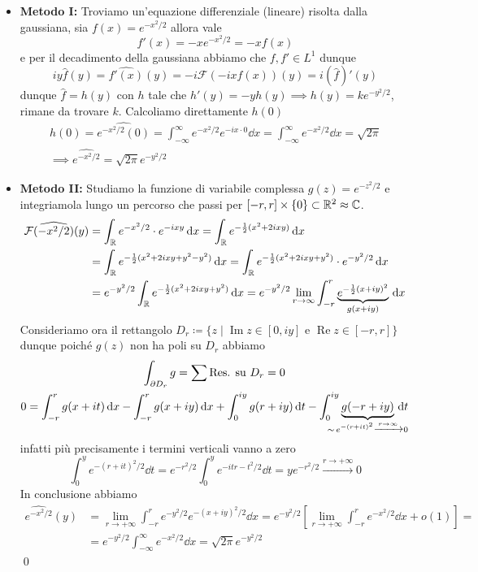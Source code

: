 \begin{itemize}
	\item \textbf{Metodo I:} Troviamo un'equazione differenziale (lineare) risolta dalla gaussiana, sia $f(x) = e^{-x^2 / 2}$ allora vale
		$$
		f'(x) = -x e^{-x^2/2} = -x f(x)
		$$
		e per il decadimento della gaussiana abbiamo che $f, f' \in L^1$ dunque
		$$
		i y \hat f(y) = \hat{f'(x)}(y) = -i \mathcal F(-i x f(x))(y) = i (\hat{f})' (y)
		$$
		dunque $\hat f = h(y)$ con $h$ tale che $h'(y) = -y h(y) \implies h(y) = k e^{-y^2 / 2}$, rimane da trovare $k$. Calcoliamo direttamente $h(0)$
		$$
		\begin{gathered}
			h(0) 
			= \hat{e^{-x^2/2}(0)} 
			= \int_{-\infty}^\infty e^{-x^2 / 2} e^{-ix \cdot 0} \dd x
			= \int_{-\infty}^\infty e^{-x^2 / 2} \dd x = \sqrt{2\pi} \\
			\implies \hat{e^{-x^2/2}} = \sqrt{2\pi} e^{-y^2 / 2}
		\end{gathered}
		$$

	\item \textbf{Metodo II:} Studiamo la funzione di variabile complessa $g(z) = e^{-z^2/2}$ e integriamola lungo un percorso che passi per $[-r, r] \times \{ 0 \} \subset \mathbb R^2 \approx \mathbb C$.
		$$
		\begin{aligned}
			\mathcal F(\widehat{-x^2/2})(y) 
			&= \int_\mathbb R e^{-x^2 / 2} \cdot e^{-ixy} \,\mathrm{d} x
			= \int_\mathbb R e^{-\frac{1}{2}(x^2 + 2ixy)} \,\mathrm{d} x \\
			&= \int_\mathbb R e^{-\frac{1}{2}(x^2 + 2ixy + y^2 - y^2)} \,\mathrm{d} x 
			= \int_\mathbb R e^{-\frac{1}{2}(x^2 + 2ixy + y^2)} \cdot e^{-y^2 / 2} \,\mathrm{d} x \\
			&= e^{-y^2 / 2} \int_\mathbb R e^{-\frac{1}{2}(x^2 + 2ixy + y^2)} \,\mathrm{d} x 
			= e^{-y^2 / 2} \lim_{r \to \infty} \int_{-r}^r \underbrace{e^{-\frac{1}{2}(x + iy)^2}}_{g(x + iy)} \,\mathrm{d} x
		\end{aligned}
		$$
		Consideriamo ora il rettangolo $D_r \coloneqq \{ z \mid \operatorname{Im} z \in [0, iy] \text{ e } \operatorname{Re} z \in [-r, r] \}$ dunque poiché $g(z)$ non ha poli su $D_r$ abbiamo
		$$
		\begin{gathered}
			\int_{\pd D_r} g = \sum \text{Res. su $D_r$} = 0 \\
			0 = \int_{-r}^r g(x + it) \dd x - \int_{-r}^r g(x + iy) \dd x 
			+ \int_{0}^{iy} g(r + iy) \dd t - \int_{0}^{iy} \underbrace{g(-r + iy)}_{\mathclap{\sim \, e^{-(r+it)^2} \xrightarrow{r \to \infty} 0}} \dd t
		\end{gathered}
		$$
		infatti più precisamente i termini verticali vanno a zero
		$$
		\int_0^y e^{-(r+it)^2 / 2} \dd t 
		= e^{-r^2 / 2} \int_0^y e^{-itr - t^2/2} \dd t = y e^{-r^2 / 2} \xrightarrow{r \to +\infty} 0
		$$
		In conclusione abbiamo
		$$
		\begin{aligned}
			\hat{e^{-x^2 / 2}} (y) 
			&= \lim_{r \to +\infty} \int_{-r}^r e^{-y^2 / 2} e^{-(x + iy)^2 / 2} \dd x 
			= e^{-y^2 / 2} \left[ \lim_{r \to +\infty} \int_{-r}^r e^{-x^2 / 2} \dd x + o(1) \right] = \\
			&= e^{-y^2 / 2} \int_{-\infty}^\infty e^{-x^2 / 2} \dd x = \sqrt{2\pi} e^{-y^2 / 2} 
		\end{aligned}
		$$
		\qed

\end{itemize}


